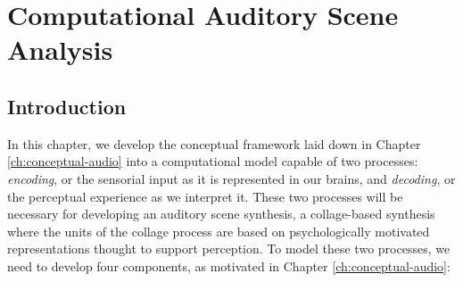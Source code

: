 \documentclass[a4paper,10pt,final]{ThesisStyle}
\begin{document}



\chapter{Computational Auditory Scene Analysis}
\label{ch:analysis-audio}
\minitoc


\section{Introduction}

In this chapter, we develop the conceptual framework laid down in Chapter \ref{ch:conceptual-audio} into a computational model capable of two processes: \textit{encoding}, or the sensorial input as it is represented in our brains, and \textit{decoding}, or the perceptual experience as we interpret it.   These two processes will be necessary for developing an auditory scene synthesis, a collage-based synthesis where the units of the collage process are based on psychologically motivated representations thought to support perception.  To model these two processes, we need to develop four components, as motivated in Chapter \ref{ch:conceptual-audio}: 
\end{document}
